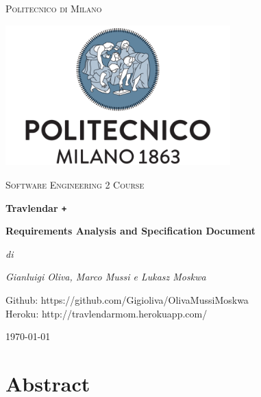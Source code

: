 \documentclass[numbers=noenddot, 12pt, a4paper, oneside]{scrbook}
\def\Plus{\texttt{+}}
\begin{document}
	
 
\begin{titlepage}
	\centering
	{\scshape\LARGE Politecnico di Milano \par}
	\vspace{1cm}
	\includegraphics[width=0.65\textwidth]{polimi-logo}\par
	\vspace{1cm}
		
	{\scshape\Large Software Engineering 2 Course\par}
	\vspace{1.5cm}
	{\huge\bfseries Travlendar \Plus \par}
	\vspace{1cm}
	{\Large\bfseries Requirements Analysis and Specification Document \par}
	\vspace{3cm}
	{\Large\itshape di\par}
	{\Large\itshape Gianluigi Oliva, Marco Mussi e Lukasz Moskwa\par}
	\vspace{1.5cm}
	Github: https://github.com/Gigioliva/OlivaMussiMoskwa\\
	Heroku: http://travlendarmom.herokuapp.com/
	\vfill

	
	\vfill
	
	{\large \today\par}
\end{titlepage}

\newpage 
\tableofcontents
\newpage 

\section*{Abstract}
\end{document}
